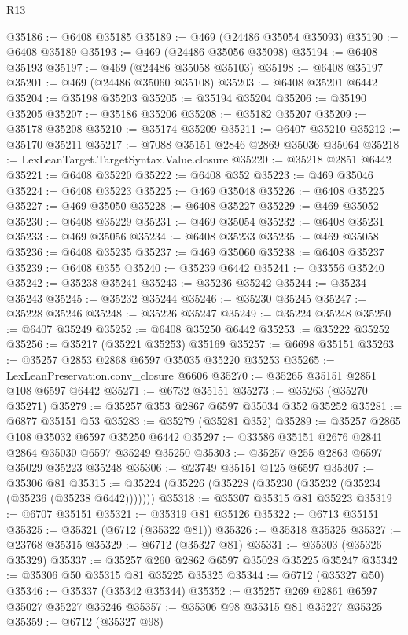 \begin{lexlean}{R13}
\begin{coremodule}
@35186 := @6408 @35185
@35189 := @469 (@24486 @35054 @35093)
@35190 := @6408 @35189
@35193 := @469 (@24486 @35056 @35098)
@35194 := @6408 @35193
@35197 := @469 (@24486 @35058 @35103)
@35198 := @6408 @35197
@35201 := @469 (@24486 @35060 @35108)
@35203 := @6408 @35201 @6442
@35204 := @35198 @35203
@35205 := @35194 @35204
@35206 := @35190 @35205
@35207 := @35186 @35206
@35208 := @35182 @35207
@35209 := @35178 @35208
@35210 := @35174 @35209
@35211 := @6407 @35210
@35212 := @35170 @35211
@35217 := @7088 @35151 @2846 @2869 @35036 @35064
@35218 := LexLeanTarget.TargetSyntax.Value.closure
@35220 := @35218 @2851 @6442
@35221 := @6408 @35220
@35222 := @6408 @352
@35223 := @469 @35046
@35224 := @6408 @35223
@35225 := @469 @35048
@35226 := @6408 @35225
@35227 := @469 @35050
@35228 := @6408 @35227
@35229 := @469 @35052
@35230 := @6408 @35229
@35231 := @469 @35054
@35232 := @6408 @35231
@35233 := @469 @35056
@35234 := @6408 @35233
@35235 := @469 @35058
@35236 := @6408 @35235
@35237 := @469 @35060
@35238 := @6408 @35237
@35239 := @6408 @355
@35240 := @35239 @6442
@35241 := @33556 @35240
@35242 := @35238 @35241
@35243 := @35236 @35242
@35244 := @35234 @35243
@35245 := @35232 @35244
@35246 := @35230 @35245
@35247 := @35228 @35246
@35248 := @35226 @35247
@35249 := @35224 @35248
@35250 := @6407 @35249
@35252 := @6408 @35250 @6442
@35253 := @35222 @35252
@35256 := @35217 (@35221 @35253) @35169
@35257 := @6698 @35151
@35263 := @35257 @2853 @2868 @6597 @35035 @35220 @35253
@35265 := LexLeanPreservation.conv_closure @6606
@35270 := @35265 @35151 @2851 @108 @6597 @6442
@35271 := @6732 @35151
@35273 := @35263 (@35270 @35271)
@35279 := @35257 @353 @2867 @6597 @35034 @352 @35252
@35281 := @6877 @35151 @53
@35283 := @35279 (@35281 @352)
@35289 := @35257 @2865 @108 @35032 @6597 @35250 @6442
@35297 := @33586 @35151 @2676 @2841 @2864 @35030 @6597 @35249 @35250
@35303 := @35257 @255 @2863 @6597 @35029 @35223 @35248
@35306 := @23749 @35151 @125 @6597
@35307 := @35306 @81
@35315 := @35224 (@35226 (@35228 (@35230 (@35232 (@35234 (@35236 (@35238 @6442)))))))
@35318 := @35307 @35315 @81 @35223
@35319 := @6707 @35151
@35321 := @35319 @81 @35126
@35322 := @6713 @35151
@35325 := @35321 (@6712 (@35322 @81))
@35326 := @35318 @35325
@35327 := @23768 @35315
@35329 := @6712 (@35327 @81)
@35331 := @35303 (@35326 @35329)
@35337 := @35257 @260 @2862 @6597 @35028 @35225 @35247
@35342 := @35306 @50 @35315 @81 @35225 @35325
@35344 := @6712 (@35327 @50)
@35346 := @35337 (@35342 @35344)
@35352 := @35257 @269 @2861 @6597 @35027 @35227 @35246
@35357 := @35306 @98 @35315 @81 @35227 @35325
@35359 := @6712 (@35327 @98)

\end{coremodule}
\end{lexlean}
